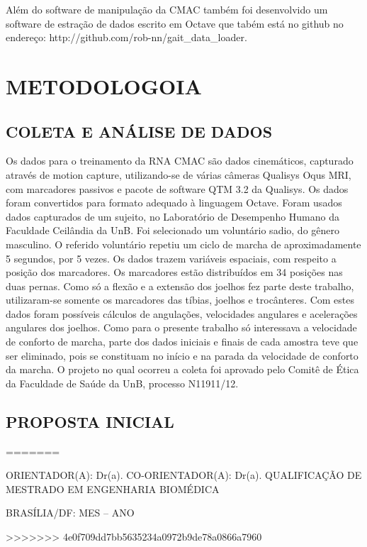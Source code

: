 \documentclass[a4paper, 12pt] {report}
\begin{document}
Além do software de manipulação da CMAC também foi desenvolvido um software de estração de dados escrito em Octave que tabém está no github no endereço: http://github.com/rob-nn/gait\_data\_loader.

	\chapter{METODOLOGOIA}
		\section{COLETA E ANÁLISE DE DADOS}
Os dados para o treinamento da RNA CMAC são dados cinemáticos, capturado através de motion capture, utilizando-se de várias câmeras Qualisys Oqus MRI, com marcadores passivos e pacote de software QTM 3.2 da Qualisys. Os dados foram convertidos para formato adequado à linguagem Octave. Foram usados dados capturados de um sujeito, no Laboratório de Desempenho Humano da Faculdade Ceilândia da UnB. Foi selecionado um voluntário sadio, do gênero masculino. O referido voluntário repetiu um ciclo de marcha de aproximadamente 5 segundos, por 5 vezes. Os dados trazem variáveis espaciais, com respeito a posição dos marcadores. Os marcadores estão distribuídos em 34 posições nas duas pernas. Como só a flexão e a extensão dos joelhos fez parte deste trabalho, utilizaram-se somente os marcadores das tíbias, joelhos e trocânteres. Com estes dados foram possíveis cálculos de angulações, velocidades angulares e acelerações angulares dos joelhos. Como para o presente trabalho só interessava a velocidade de conforto de marcha, parte dos dados iniciais e finais de cada amostra teve que ser eliminado, pois se constituam no início e na parada da velocidade de conforto da marcha. O projeto no qual ocorreu a coleta foi aprovado pelo Comitê de Ética da Faculdade de Saúde da UnB, processo N11911/12.

		\section{PROPOSTA INICIAL}
=======
	\begin{center}
		ORIENTADOR(A): Dr(a). 
		CO-ORIENTADOR(A): Dr(a).
		QUALIFICAÇÃO DE  MESTRADO EM ENGENHARIA BIOMÉDICA

		BRASÍLIA/DF: MES – ANO
	\end{center}
>>>>>>> 4e0f709dd7bb5635234a0972b9de78a0866a7960
\end{document}
